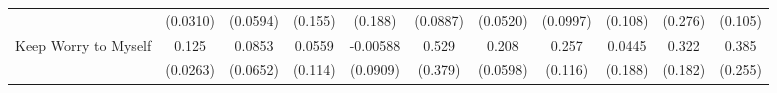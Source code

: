 {\begin{tabular}{l*{10}{c}}
            &    (0.0310)         &    (0.0594)         &     (0.155)         &     (0.188)         &    (0.0887)         &    (0.0520)         &    (0.0997)         &     (0.108)         &     (0.276)         &     (0.105)         \\
\addlinespace
Keep Worry to Myself&       0.125\sym{***}&      0.0853         &      0.0559         &    -0.00588         &       0.529         &       0.208\sym{***}&       0.257\sym{*}  &      0.0445         &       0.322         &       0.385         \\
            &    (0.0263)         &    (0.0652)         &     (0.114)         &    (0.0909)         &     (0.379)         &    (0.0598)         &     (0.116)         &     (0.188)         &     (0.182)         &     (0.255)         \\
\bottomrule
\end{tabular}
}
